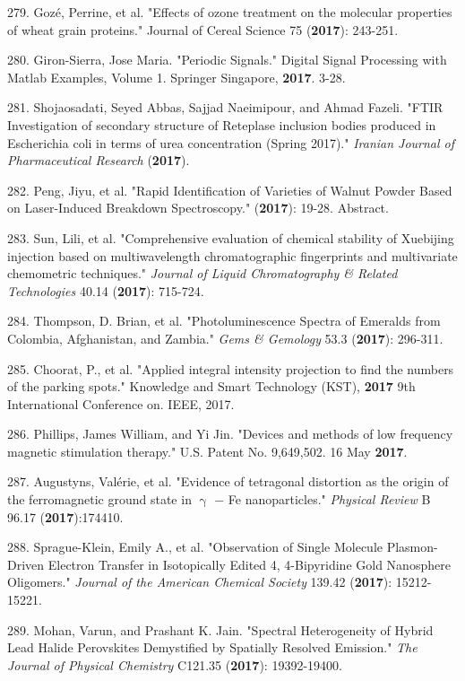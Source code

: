 279. Goz\'{e}, Perrine, et al. "Effects of ozone treatment on the molecular properties of wheat grain proteins." Journal of Cereal Science 75 (\textbf{2017}): 243-251.

280. Giron-Sierra, Jose Maria. "Periodic Signals." Digital Signal Processing with Matlab Examples, Volume 1. Springer Singapore, \textbf{2017}. 3-28.

281. Shojaosadati, Seyed Abbas, Sajjad Naeimipour, and Ahmad Fazeli. "FTIR Investigation of secondary structure of Reteplase inclusion bodies produced in Escherichia coli in terms of urea concentration (Spring 2017)." \textit{Iranian Journal of Pharmaceutical Research} (\textbf{2017}).

282. Peng, Jiyu, et al. "Rapid Identification of Varieties of Walnut Powder Based on Laser-Induced Breakdown Spectroscopy." (\textbf{2017}): 19-28. Abstract.

283. Sun, Lili, et al. "Comprehensive evaluation of chemical stability of Xuebijing injection based on multiwavelength chromatographic fingerprints and multivariate chemometric techniques." \textit{Journal of Liquid Chromatography \& Related Technologies} 40.14 (\textbf{2017}): 715-724.

284. Thompson, D. Brian, et al. "Photoluminescence Spectra of Emeralds from Colombia, Afghanistan, and Zambia." \textit{Gems \& Gemology} 53.3 (\textbf{2017}): 296-311.

285. Choorat, P., et al. "Applied integral intensity projection to find the numbers of the parking spots." Knowledge and Smart Technology (KST), \textbf{2017} 9th International Conference on. IEEE, 2017.

286. Phillips, James William, and Yi Jin. "Devices and methods of low frequency magnetic stimulation therapy." U.S. Patent No. 9,649,502. 16 May \textbf{2017}.

287. Augustyns, Val\'{e}rie, et al. "Evidence of tetragonal distortion as the origin of the ferromagnetic ground state in ${\upgamma}$ ${-}$ Fe nanoparticles." \textit{Physical Review} B 96.17 (\textbf{2017}):174410.

288. Sprague-Klein, Emily A., et al. "Observation of Single Molecule Plasmon-Driven Electron Transfer in Isotopically Edited 4, 4-Bipyridine Gold Nanosphere Oligomers." \textit{Journal of the American Chemical Society} 139.42 (\textbf{2017}): 15212-15221.

289. Mohan, Varun, and Prashant K. Jain. "Spectral Heterogeneity of Hybrid Lead Halide Perovskites Demystified by Spatially Resolved Emission." \textit{The Journal of Physical Chemistry} C121.35 (\textbf{2017}): 19392-19400.

